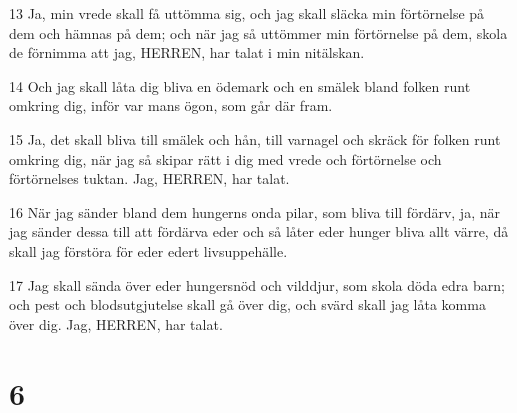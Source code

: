 \par 13 Ja, min vrede skall få uttömma sig, och jag skall släcka min förtörnelse på dem och hämnas på dem; och när jag så uttömmer min förtörnelse på dem, skola de förnimma att jag, HERREN, har talat i min nitälskan.
\par 14 Och jag skall låta dig bliva en ödemark och en smälek bland folken runt omkring dig, inför var mans ögon, som går där fram.
\par 15 Ja, det skall bliva till smälek och hån, till varnagel och skräck för folken runt omkring dig, när jag så skipar rätt i dig med vrede och förtörnelse och förtörnelses tuktan. Jag, HERREN, har talat.
\par 16 När jag sänder bland dem hungerns onda pilar, som bliva till fördärv, ja, när jag sänder dessa till att fördärva eder och så låter eder hunger bliva allt värre, då skall jag förstöra för eder edert livsuppehälle.
\par 17 Jag skall sända över eder hungersnöd och vilddjur, som skola döda edra barn; och pest och blodsutgjutelse skall gå över dig, och svärd skall jag låta komma över dig. Jag, HERREN, har talat.

\chapter{6}

